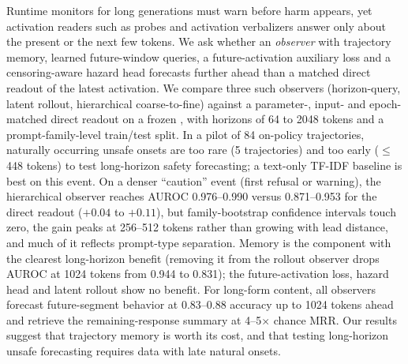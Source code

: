 Runtime monitors for long generations must warn before harm appears, yet activation readers such as probes and activation verbalizers answer only about the present or the next few tokens.
We ask whether an \emph{observer} with trajectory memory, learned future-window queries, a future-activation auxiliary loss and a censoring-aware hazard head forecasts further ahead than a matched direct readout of the latest activation.
We compare three such observers (horizon-query, latent rollout, hierarchical coarse-to-fine) against a parameter-, input- and epoch-matched direct readout on a frozen \qwen, with horizons of 64 to 2048 tokens and a prompt-family-level train/test split.
In a pilot of 84 on-policy trajectories, naturally occurring unsafe onsets are too rare (5 trajectories) and too early ($\le$448 tokens) to test long-horizon safety forecasting; a text-only TF-IDF baseline is best on this event.
On a denser ``caution'' event (first refusal or warning), the hierarchical observer reaches AUROC 0.976--0.990 versus 0.871--0.953 for the direct readout ($+0.04$ to $+0.11$), but family-bootstrap confidence intervals touch zero, the gain peaks at 256--512 tokens rather than growing with lead distance, and much of it reflects prompt-type separation.
Memory is the component with the clearest long-horizon benefit (removing it from the rollout observer drops AUROC at 1024 tokens from 0.944 to 0.831); the future-activation loss, hazard head and latent rollout show no benefit.
For long-form content, all observers forecast future-segment behavior at 0.83--0.88 accuracy up to 1024 tokens ahead and retrieve the remaining-response summary at 4--5$\times$ chance MRR.
Our results suggest that trajectory memory is worth its cost, and that testing long-horizon unsafe forecasting requires data with late natural onsets.
